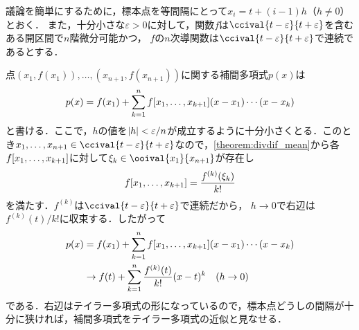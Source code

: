 \documentclass[../../main]{subfiles}
\begin{document}
議論を簡単にするために，標本点を等間隔にとって\(x_i=t+(i-1)h\)（\(h\neq 0\)）とおく．
また，十分小さな\(\varepsilon>0\)に対して，関数\(f\)は\(\ccival{t-\varepsilon}{t+\varepsilon}\)を含むある開区間で\(n\)階微分可能かつ，
\(f\)の\(n\)次導関数は\(\ccival{t-\varepsilon}{t+\varepsilon}\)で連続であるとする．

点\((x_1,f(x_1)),\dots,(x_{n+1},f(x_{n+1}))\)に関する補間多項式\(p(x)\)は
\[
  p(x) = f(x_1)+\sum_{k=1}^n\divdiff[f]{x_1,\dots,x_{k+1}}(x-x_1)\dotsm(x-x_k)
\]
と書ける．ここで，\(h\)の値を\(\abs{h}<\varepsilon/n\)が成立するように十分小さくとる．このとき\(x_1,\dots,x_{n+1}\in\ccival{t-\varepsilon}{t+\varepsilon}\)なので，\cref{theorem:divdif_mean}から各\(\divdiff[f]{x_1,\dots,x_{k+1}}\)に対して\(\xi_k\in\ooival{x_1}{x_{n+1}}\)が存在し
\[
  \divdiff[f]{x_1,\dots,x_{k+1}} = \frac{f^{(k)}(\xi_k)}{k!}
\]
を満たす．\(f^{(k)}\)は\(\ccival{t-\varepsilon}{t+\varepsilon}\)で連続だから，
\(h\to 0\)で右辺は\(f^{(k)}(t)/k!\)に収束する．したがって
\begin{align}
  \label{equation:newton_taylor}
  p(x) &=f(x_1)+\sum_{k=1}^n\divdiff[f]{x_1,\dots,x_{k+1}}(x-x_1)\dotsm (x-x_k) \\
  &\to f(t)+\sum_{k=1}^n\frac{f^{(k)}(t)}{k!}(x-t)^k\quad(h\to 0)
\end{align}
である．右辺はテイラー多項式の形になっているので，標本点どうしの間隔が十分に狭ければ，補間多項式をテイラー多項式の近似と見なせる．
\end{document}
